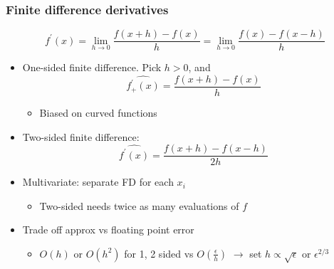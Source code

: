 \documentclass[bigger]{beamer}
\begin{document}
\begin{frame}

\frametitle{Finite difference derivatives}

\begin{equation*}
f^{\prime }\left( x\right) =\lim_{h\rightarrow 0}\frac{f(x+h)-f\left(
x\right) }{h}=\lim_{h\rightarrow 0}\frac{f(x)-f\left( x-h\right) }{h}
\end{equation*}

\begin{itemize}
\item One-sided finite difference. Pick $h>0$, and 
\begin{equation*}
\widehat{f_{+}^{\prime }\left( x\right) }=\frac{f(x+h)-f\left( x\right) }{h}
\end{equation*}

\begin{itemize}
\item Biased on curved functions
\end{itemize}

\item Two-sided finite difference: 
\begin{equation*}
\widehat{f^{\prime }\left( x\right) }=\frac{f(x+h)-f\left( x-h\right) }{2h}
\end{equation*}

\item Multivariate: separate FD for each $x_{i}$

\begin{itemize}
\item Two-sided needs twice as many evaluations of $f$
\end{itemize}

\item Trade off approx vs floating point error
\begin{itemize}
\item $O(h)$ or $O(h^2)$ for 1, 2 sided vs $O(\frac{\epsilon}{h})$ $\to$ set $h\propto \sqrt\epsilon$ or $\epsilon^{2/3}$
\end{itemize}
\end{itemize}


\end{frame}%
\end{document}
